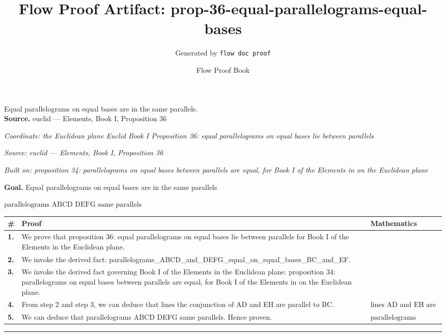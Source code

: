 \documentclass[11pt]{article}
\title{Flow Proof Artifact: prop-36-equal-parallelograms-equal-bases}
\author{Generated by \texttt{flow doc proof}}
\date{Flow Proof Book}
\theoremstyle{definition}
\begin{document}
\maketitle
Equal parallelograms on equal bases are in the same parallels.\\[0.5em]
\textbf{Source.} euclid — Elements, Book I, Proposition 36\\[0.5em]
\bigskip
{}\par
\smallskip\noindent\textit{Coordinate: the Euclidean plane \cdot Euclid Book I \cdot Proposition 36: equal parallelograms on equal bases lie between parallels}\par
\smallskip\noindent\textit{Source: euclid — Elements, Book I, Proposition 36}\par
\smallskip\noindent\textit{Built on: proposition 34: parallelograms on equal bases between parallels are equal, for Book I of the Elements in on the Euclidean plane}\par
\medskip
\noindent\textbf{Goal.} Equal parallelograms on equal bases are in the same parallels\par
\noindent$\displaystyle \text{parallelograms ABCD DEFG same parallels}$\par
\medskip
\noindent
\begin{tabular}{@{} >{\raggedright\arraybackslash}p{} >{\raggedright\arraybackslash}p{} >{\raggedleft\arraybackslash}p{} @{}}
\textbf{\#} & \textbf{Proof} & \textbf{Mathematics} \\
\midrule
\textbf{1.} & We prove that proposition 36: equal parallelograms on equal bases lie between parallels for Book I of the Elements in the Euclidean plane. & \\[0.45em]
\textbf{2.} & We invoke the derived fact: parallelograms\_ABCD\_and\_DEFG\_equal\_on\_equal\_bases\_BC\_and\_EF. & \\[0.45em]
\textbf{3.} & We invoke the derived fact governing Book I of the Elements in the Euclidean plane: proposition 34: parallelograms on equal bases between parallels are equal, for Book I of the Elements in on the Euclidean plane. & \\[0.45em]
\textbf{4.} & From step 2 and step 3, we can deduce that lines the conjunction of AD and EH are parallel to BC. & $\displaystyle \text{lines AD and EH are parallel to BC}$ \\[0.45em]
\textbf{5.} & We can deduce that parallelograms ABCD DEFG same parallels. Hence proven. & $\displaystyle \text{parallelograms ABCD DEFG same parallels}$ \\[0.45em]
\bottomrule
\end{tabular}
\label{thm:Geometry-Euclid Book I-proposition_36_equal_parallelograms_on_equal_bases_lie_between_parallels}
\par\medskip\hrule
\end{document}
